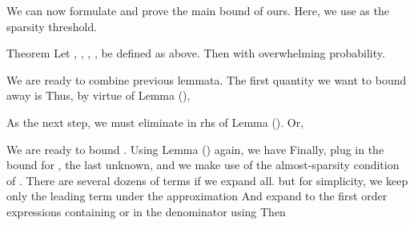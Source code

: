 \startsection [title={The Main Bound}]

We can now formulate and prove the main bound of ours.
Here, we use  as the sparsity threshold.

\Result
{Theorem}
{
Let , , , ,  be defined as above.
Then
with overwhelming probability.
}

We are ready to combine previous lemmata.
The first quantity we want to bound away is
Thus, by virtue of Lemma (),

As the next step, we must eliminate  in rhs of Lemma ().
Or,

We are ready to bound .
Using Lemma () again, we have
Finally, plug in the bound for , the last unknown, and we make use of the almost-sparsity condition of .
There are several dozens of terms if we expand all.
but for simplicity, we keep only the leading term under the approximation
And expand to the first order expressions containing  or  in the denominator using
Then


\color[red]{(To be done)}

\stopchapter
